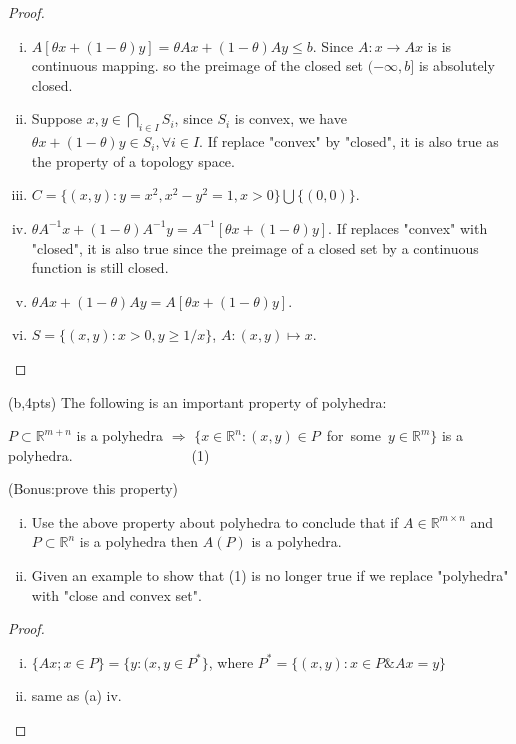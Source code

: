 \documentclass{article}     %
\begin{document}
\begin{proof}
\begin{enumerate}[i.]
\item  $A[\theta x +(1-\theta)y]= \theta Ax +(1-\theta) Ay\leq b$. Since $A:x\rightarrow Ax$ is is continuous mapping. so the preimage of the closed set $(-\infty,b]$ is absolutely closed.

\item  Suppose $x,y\in \bigcap_{i\in I}S_i$, since  $S_i$ is convex, we have $\theta x +(1-\theta)y \in S_i, \forall i\in I$. If replace "convex" by "closed", it is also true as the property of a topology space.
\item  $C=\{(x,y):y=x^2,x^2-y^2=1,x>0\}\bigcup \{(0,0)\}$.

\item $\theta A^{-1}x + (1-\theta)A^{-1}y = A^{-1}[\theta x +(1-\theta)y]$. If replaces "convex" with "closed", it is also true since the preimage of a closed set by a continuous function is still closed.

\item $\theta Ax +(1-\theta) Ay=A[\theta x +(1-\theta)y]$.
\item $S=\{(x,y):x>0,y\geq 1/x\}$, $A: (x,y)\mapsto x$.
\end{enumerate}






\end{proof}




(b,4pts) The following is an important property of polyhedra:


$P \subset \mathbb{R}^{m+n}$ is a polyhedra $\Rightarrow$ $\{x\in \mathbb{R}^n: (x,y)\in P$~for~some~$y\in\mathbb{R}^m\}$ is a polyhedra.~~~~~~~~~~~~~~~~~(1)


(Bonus:prove this property)
\begin{enumerate}[i.]
    \item Use the above property about polyhedra to conclude that if $A \in \mathbb{R}^{m\times n}$ and $P\subset \mathbb{R}^{n}$ is a polyhedra then $A(P)$ is a polyhedra.
    \item Given an example to show that (1) is no longer true if we replace "polyhedra" with "close and convex set".
\end{enumerate}

\begin{proof}
\begin{enumerate}[i.]

    \item $\{Ax;x\in P\}=\{y:(x,y\in P^*\}$, 
   where $P^*=\{(x,y): x\in P \& Ax=y\}$
    \item same as (a) iv.

 \end{enumerate}
\end{proof}
\end{document}

